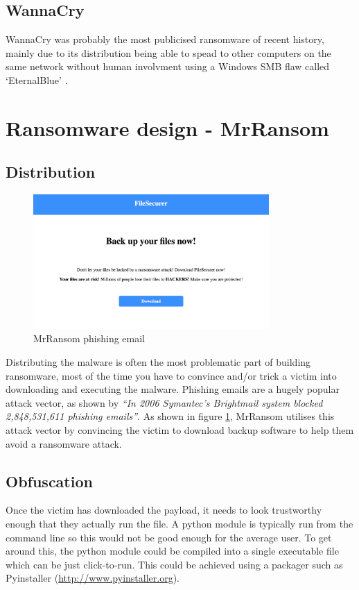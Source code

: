 \documentclass[12pt]{article}
\begin{document}
  \subsection{WannaCry}
    WannaCry was probably the most publicised ransomware of recent history, mainly due to its distribution being able to spead to other computers on the same network without human involvment using a Windows SMB flaw called ‘EternalBlue’ \citep{symnatec2017wannacry}.

\section{Ransomware design - MrRansom}

  \subsection{Distribution}
    \begin{figure}[ht]
      \centering
      \includegraphics[width=9cm]{phishing}
      \caption{MrRansom phishing email}
      \label{fig:mrransom-phishing}
    \end{figure}

    Distributing the malware is often the most problematic part of building ransomware, most of the time you have to convince and/or trick a victim into downloading and executing the malware. Phishing emails are a hugely popular attack vector, as shown by \cite{ramzan2007phishing} \textit{“In 2006 Symantec’s Brightmail system blocked 2,848,531,611 phishing emails”}. As shown in figure \ref{fig:mrransom-phishing}, MrRansom utilises this attack vector by convincing the victim to download backup software to help them avoid a ransomware attack.

  \subsection{Obfuscation}
    Once the victim has downloaded the payload, it needs to look trustworthy enough that they actually run the file. A python module is typically run from the command line so this would not be good enough for the average user. To get around this, the python module could be compiled into a single executable file which can be just click-to-run. This could be achieved using a packager such as Pyinstaller (\url{http://www.pyinstaller.org}).
\end{document}
